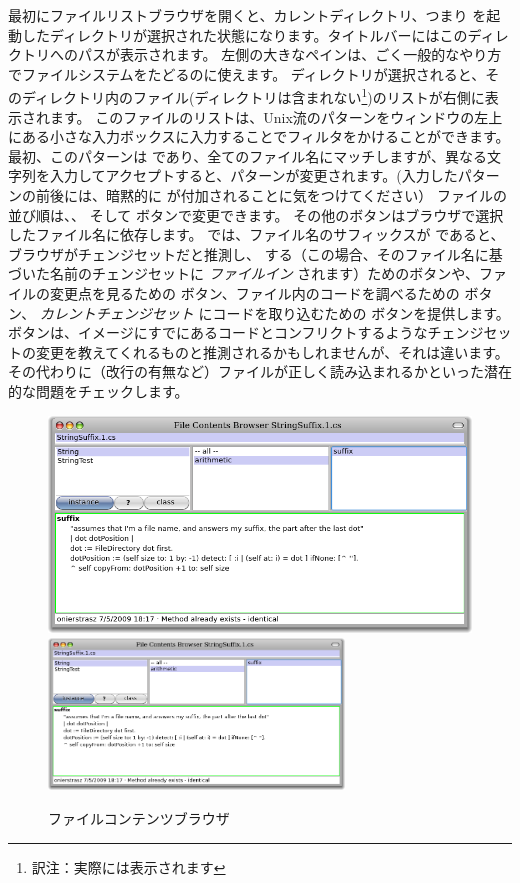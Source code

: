 \documentclass[a4paper,10pt,twoside]{book}
\begin{document}
最初にファイルリストブラウザを開くと、カレントディレクトリ、つまり \pharo を起動したディレクトリが選択された状態になります。タイトルバーにはこのディレクトリへのパスが表示されます。
左側の大きなペインは、ごく一般的なやり方でファイルシステムをたどるのに使えます。
ディレクトリが選択されると、そのディレクトリ内のファイル(ディレクトリは含まれない\footnote{訳注：実際には表示されます})のリストが右側に表示されます。
このファイルのリストは、Unix流のパターンをウィンドウの左上にある小さな入力ボックスに入力することでフィルタをかけることができます。
最初、このパターンは \ct{*} であり、全てのファイル名にマッチしますが、異なる文字列を入力してアクセプトすると、パターンが変更されます。(入力したパターンの前後には、暗黙的に \ct{*} が付加されることに気をつけてください）
ファイルの並び順は、、 そして  ボタンで変更できます。
その他のボタンはブラウザで選択したファイル名に依存します。
 では、ファイル名のサフィックスが  であると、ブラウザがチェンジセットだと推測し、 する（この場合、そのファイル名に基づいた名前のチェンジセットに \textit{ファイルイン} されます）ためのボタンや、ファイルの変更点を見るための  ボタン、ファイル内のコードを調べるための  ボタン、
\emph{カレントチェンジセット} にコードを取り込むための ボタンを提供します。
 ボタンは、イメージにすでにあるコードとコンフリクトするようなチェンジセットの変更を教えてくれるものと推測されるかもしれませんが、それは違います。
その代わりに（改行の有無など）ファイルが正しく読み込まれるかといった潜在的な問題をチェックします。

\begin{figure}[btp]
\begin{center}
\ifluluelse
{\includegraphics[width=\textwidth]{fileContentsBrowser}}
{\includegraphics[width=0.7\textwidth]{fileContentsBrowser}}
\end{center}
\caption{ファイルコンテンツブラウザ}
\end{figure}
\end{document}
